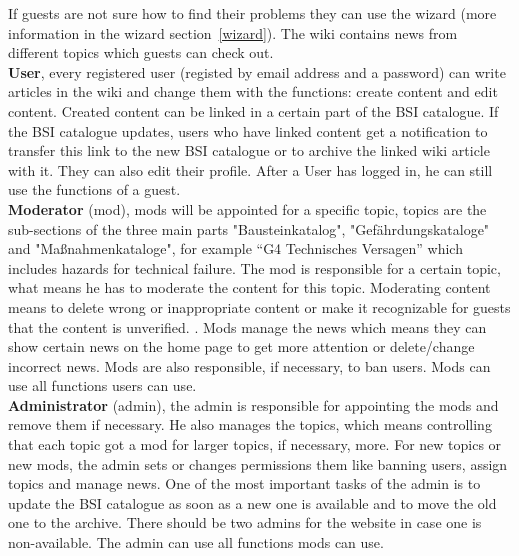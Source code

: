 If guests are not sure how to find their problems they can use the wizard (more information in the wizard section~\ref{wizard}). 
The wiki contains news from different topics which guests can check out.
\\
\textbf{User}, every registered user (registed by email address and a password) can write articles in the wiki and change them with the functions: create content and edit content. 
Created content can be linked in a certain part of the BSI catalogue. 
If the BSI catalogue updates, users who have linked content get a notification to transfer this link to the new BSI catalogue or to archive the linked wiki article with it.
They can also edit their profile. 
After a User has logged in, he can still use the functions of a guest.
\\
\textbf{Moderator} (mod), mods will be appointed for a specific topic, topics are the sub-sections of the three main parts "Bausteinkatalog", "Gefährdungskataloge" and "Maßnahmenkataloge", for example “G4 Technisches Versagen” which includes hazards for technical failure. 
The mod is responsible for a certain topic, what means he has to moderate the content for this topic. 
Moderating content means to delete wrong or inappropriate content or make it recognizable for guests that the content is unverified.  .  
Mods manage the news which means they can show certain news on the home page to get more attention or delete/change incorrect news. 
Mods are also responsible, if necessary, to ban users. 
Mods can use all functions users can use.
\\
\textbf{Administrator} (admin), the admin is responsible for appointing the mods and remove them if necessary. He also manages the topics, which means controlling that each topic got a mod for larger topics, if necessary, more. 
For new topics or new mods, the admin sets or changes permissions them like banning users, assign topics and manage news. 
One of the most important tasks of the admin is to update the BSI catalogue as soon as a new one is available and to move the old one to the archive.  There should be two admins for the website in case one is non-available.
The admin can use all functions mods can use. 


